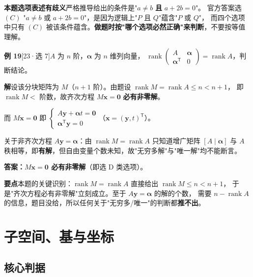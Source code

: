\documentclass[10pt]{ctexart}
\newcommand{\rank}{\operatorname{rank}}
\newcommand{\TT}{^{\mathsf T}}
\newcommand{\bv}[1]{\begin{pmatrix}#1\end{pmatrix}}
\newcommand{\yiii}[1]{\textcolor{y23}{[23·#1]}}
\begin{document}
\begin{warnbox}
\textbf{本题选项表述有歧义}\quad 严格推导给出的条件是"$a\ne b$ \textbf{且} $a+2b=0$"。
官方答案选 $(C)$ "$a\ne b$ 或 $a+2b=0$"，是因为逻辑上"$P$ 且 $Q$"蕴含"$P$ 或 $Q$"，
而四个选项中只有 $(C)$ 被该条件蕴含。\textbf{做题时按"哪个选项必然正确"来判断}，不要按等值理解。
\end{warnbox}

\medskip
\textbf{例 19}\yiii{选 7}\quad $A$ 为 $n$ 阶，$\boldsymbol\alpha$ 为 $n$ 维列向量，
$\rank\bv{A&\boldsymbol\alpha\\\boldsymbol\alpha\TT&0}=\rank A$，判断结论。

\textbf{解}\quad 设该分块矩阵为 $M$（$n+1$ 阶）。由题设 $\rank M=\rank A\le n<n+1$，
即 $\rank M<$ 阶数，故齐次方程 $M\mathbf x=\mathbf 0$ \textbf{必有非零解}。

而 $M\mathbf x=\mathbf 0$ 即 $\begin{cases}A\mathbf y+\boldsymbol\alpha t=\mathbf 0\\ \boldsymbol\alpha\TT\mathbf y=0\end{cases}$（$\mathbf x=(\mathbf y,t)\TT$）。

关于非齐次方程 $A\mathbf y=\boldsymbol\alpha$：由 $\rank M=\rank A$ 只知道增广矩阵
$[A\mid\boldsymbol\alpha]$ 与 $A$ 秩相等，即\textbf{有解}，但自由变量个数未知，故"无穷多解"与"唯一解"均不能断言。

\textbf{答案：$M\mathbf x=\mathbf 0$ 必有非零解}（即选 D 类选项）。

\begin{tipbox}
\textbf{要点}\quad 本题的关键识别：$\rank M=\rank A$\; 直接给出 $\rank M\le n<n+1$，
于是"齐次方程必有非零解"立刻成立。至于 $A\mathbf y=\boldsymbol\alpha$ 的解的个数，
需要 $n-\rank A$ 的信息，题目没给，所以任何关于"无穷多/唯一"的判断都\textbf{推不出}。
\end{tipbox}

\section{子空间、基与坐标}

\subsection{核心判据}
\end{document}
